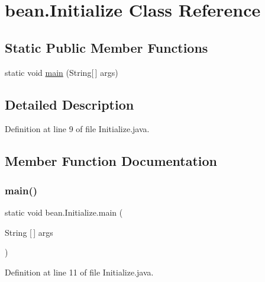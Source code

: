 \hypertarget{classbean_1_1Initialize}{}\section{bean.\+Initialize Class Reference}
\label{classbean_1_1Initialize}
\subsection*{Static Public Member Functions}
\begin{DoxyCompactItemize}
\item 
static void \mbox{\hyperlink{classbean_1_1Initialize_ac27694871d059edf0df3cdccc11f89ad}{main}} (String\mbox{[}$\,$\mbox{]} args)
\end{DoxyCompactItemize}


\subsection{Detailed Description}


Definition at line 9 of file Initialize.\+java.



\subsection{Member Function Documentation}
\mbox{\label{classbean_1_1Initialize_ac27694871d059edf0df3cdccc11f89ad}} 
\subsubsection{\texorpdfstring{main()}{main()}}
{\footnotesize\ttfamily static void bean.\+Initialize.\+main (\begin{DoxyParamCaption}\item[{String \mbox{[}$\,$\mbox{]}}]{args }\end{DoxyParamCaption})\hspace{0.3cm}{\ttfamily [static]}}



Definition at line 11 of file Initialize.\+java.


\begin{DoxyCode}{0}

\end{DoxyCode}


